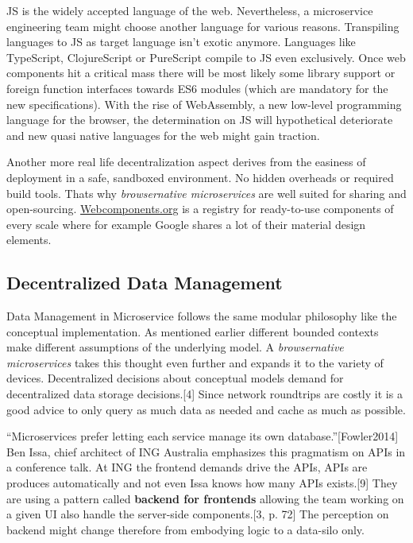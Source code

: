 \documentclass[]{assets/latex/ieee}
\begin{document}
JS is the widely accepted language of the web. Nevertheless, a
microservice engineering team might choose another language for various
reasons. Transpiling languages to JS as target language isn't exotic
anymore. Languages like TypeScript, ClojureScript or PureScript compile
to JS even exclusively. Once web components hit a critical mass there
will be most likely some library support or foreign function interfaces
towards ES6 modules (which are mandatory for the new specifications).
With the rise of WebAssembly, a new low-level programming language for
the browser, the determination on JS will hypothetical deteriorate and
new quasi native languages for the web might gain traction.

Another more real life decentralization aspect derives from the easiness
of deployment in a safe, sandboxed environment. No hidden overheads or
required build tools. Thats why \emph{browsernative microservices} are
well suited for sharing and open-sourcing.
\href{https://webcomponents.org}{Webcomponents.org} is a registry for
ready-to-use components of every scale where for example Google shares a
lot of their material design elements.

\subsection{Decentralized Data
Management}\label{decentralized-data-management}

Data Management in Microservice follows the same modular philosophy like
the conceptual implementation. As mentioned earlier different bounded
contexts make different assumptions of the underlying model. A
\emph{browsernative microservices} takes this thought even further and
expands it to the variety of devices. Decentralized decisions about
conceptual models demand for decentralized data storage
decisions.{[}4{]} Since network roundtrips are costly it is a good
advice to only query as much data as needed and cache as much as
possible.

``Microservices prefer letting each service manage its own
database.''{[}Fowler2014{]} Ben Issa, chief architect of ING Australia
emphasizes this pragmatism on APIs in a conference talk. At ING the
frontend demands drive the APIs, APIs are produces automatically and not
even Issa knows how many APIs exists.{[}9{]} They are using a pattern
called \textbf{backend for frontends} allowing the team working on a
given UI also handle the server-side components.{[}3, p. 72{]} The
perception on backend might change therefore from embodying logic to a
data-silo only.
\end{document}
